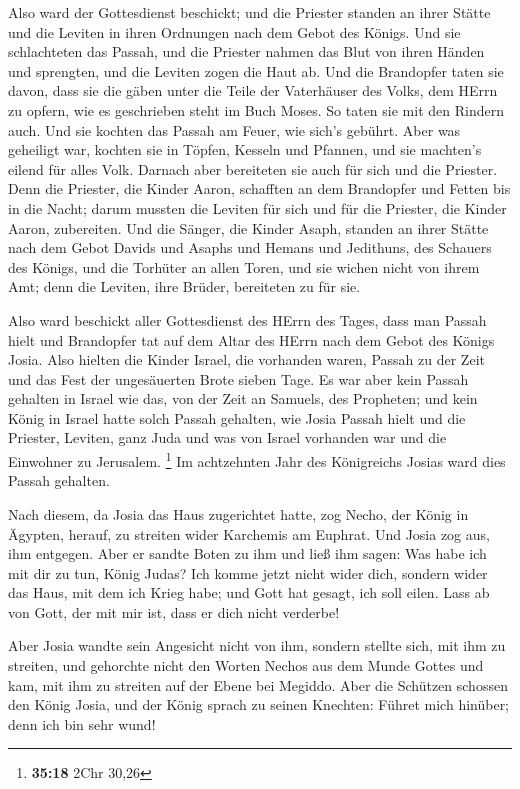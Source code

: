  Also ward der Gottesdienst beschickt; und die Priester
standen an ihrer Stätte und die Leviten in ihren Ordnungen nach dem
Gebot des Königs.  Und sie schlachteten das Passah, und die
Priester nahmen das Blut von ihren Händen und sprengten, und die Leviten
zogen die Haut ab.  Und die Brandopfer taten sie davon,
dass sie die gäben unter die Teile der Vaterhäuser des Volks, dem HErrn
zu opfern, wie es geschrieben steht im Buch Moses. So taten sie mit den
Rindern auch.  Und sie kochten das Passah am Feuer, wie
sich's gebührt. Aber was geheiligt war, kochten sie in Töpfen, Kesseln
und Pfannen, und sie machten's eilend für alles Volk. 
Darnach aber bereiteten sie auch für sich und die Priester. Denn die
Priester, die Kinder Aaron, schafften an dem Brandopfer und Fetten bis
in die Nacht; darum mussten die Leviten für sich und für die Priester,
die Kinder Aaron, zubereiten.  Und die Sänger, die Kinder
Asaph, standen an ihrer Stätte nach dem Gebot Davids und Asaphs und
Hemans und Jedithuns, des Schauers des Königs, und die Torhüter an allen
Toren, und sie wichen nicht von ihrem Amt; denn die Leviten, ihre
Brüder, bereiteten zu für sie.

 Also ward beschickt aller Gottesdienst des HErrn des
Tages, dass man Passah hielt und Brandopfer tat auf dem Altar des HErrn
nach dem Gebot des Königs Josia.  Also hielten die Kinder
Israel, die vorhanden waren, Passah zu der Zeit und das Fest der
ungesäuerten Brote sieben Tage.  Es war aber kein Passah
gehalten in Israel wie das, von der Zeit an Samuels, des Propheten; und
kein König in Israel hatte solch Passah gehalten, wie Josia Passah hielt
und die Priester, Leviten, ganz Juda und was von Israel vorhanden war
und die Einwohner zu Jerusalem. \footnote{\textbf{35:18} 2Chr 30,26}
 Im achtzehnten Jahr des Königreichs Josias ward dies
Passah gehalten.

 Nach diesem, da Josia das Haus zugerichtet hatte, zog
Necho, der König in Ägypten, herauf, zu streiten wider Karchemis am
Euphrat. Und Josia zog aus, ihm entgegen.  Aber er sandte
Boten zu ihm und ließ ihm sagen: Was habe ich mit dir zu tun, König
Judas? Ich komme jetzt nicht wider dich, sondern wider das Haus, mit dem
ich Krieg habe; und Gott hat gesagt, ich soll eilen. Lass ab von Gott,
der mit mir ist, dass er dich nicht verderbe!

 Aber Josia wandte sein Angesicht nicht von ihm, sondern
stellte sich, mit ihm zu streiten, und gehorchte nicht den Worten Nechos
aus dem Munde Gottes und kam, mit ihm zu streiten auf der Ebene bei
Megiddo.  Aber die Schützen schossen den König Josia, und
der König sprach zu seinen Knechten: Führet mich hinüber; denn ich bin
sehr wund!

